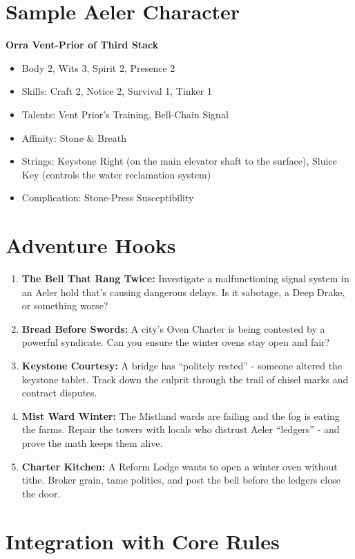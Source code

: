 \documentclass[11pt]{article}
\begin{document}
\section*{Sample Aeler Character}

\textbf{Orra Vent-Prior of Third Stack}
\begin{itemize}
  \item Body 2, Wits 3, Spirit 2, Presence 2
  \item Skills: Craft 2, Notice 2, Survival 1, Tinker 1
  \item Talents: Vent Prior's Training, Bell-Chain Signal
  \item Affinity: Stone \& Breath
  \item Strings: Keystone Right (on the main elevator shaft to the surface), Sluice Key (controls the water reclamation system)
  \item Complication: Stone-Press Susceptibility
\end{itemize}

\section*{Adventure Hooks}
\begin{enumerate}
  \item \textbf{The Bell That Rang Twice:} Investigate a malfunctioning signal system in an Aeler hold that's causing dangerous delays. Is it sabotage, a Deep Drake, or something worse?
  \item \textbf{Bread Before Swords:} A city's Oven Charter is being contested by a powerful syndicate. Can you ensure the winter ovens stay open and fair?
  \item \textbf{Keystone Courtesy:} A bridge has ``politely rested'' - someone altered the keystone tablet. Track down the culprit through the trail of chisel marks and contract disputes.
  \item \textbf{Mist Ward Winter:} The Mistland wards are failing and the fog is eating the farms. Repair the towers with locals who distrust Aeler ``ledgers'' - and prove the math keeps them alive.
  \item \textbf{Charter Kitchen:} A Reform Lodge wants to open a winter oven without tithe. Broker grain, tame politics, and post the bell before the ledgers close the door.
\end{enumerate}

\section*{Integration with Core Rules}
\end{document}
